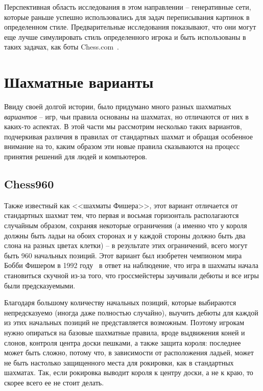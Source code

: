 \documentclass{article}
\begin{document}
Перспективная область исследования в этом направлении -- генеративные сети,
которые раньше успешно использовались для задач переписывания картинок в определенном стиле.
Предварительные исследования показывают, что они могут еще лучше симулировать стиль определенного игрока
и быть использованы в таких задачах, как боты Chess.com~\cite{chess-stylegan}.

\section{Шахматные варианты}

Ввиду своей долгой истории, было придумано много разных шахматных \emph{вариантов} --
игр, чьи правила основаны на шахматах, но отличаются от них в каких-то аспектах.
В этой части мы рассмотрим несколько таких вариантов, 
подчеркивая различия в правилах от стандартных шахмат
и обращая особенное внимание на то,
каким образом эти новые правила
сказываются на процесс принятия решений для людей и компьютеров.

\subsection{Chess960}

Также известный как <<шахматы Фишера>>, этот вариант
отличается от стандартных шахмат тем, что первая и восьмая горизонталь располагаются случайным образом,
сохраняя некоторые ограничения (а именно что у короля должны быть ладьи на обоих сторонах и у каждой стороны должно быть два слона на разных цветах клетки) --
в результате этих ограничений, всего могут быть 960 начальных позиций.
Этот вариант был изобретен чемпионом мира Бобби Фишером в 1992 году~\cite{chess960}
в ответ на наблюдение, что игра в шахматы начала становиться скучной
из-за того, что гроссмейстеры заучивали дебюты 
и все игры были предсказуемыми.

Благодаря большому количеству начальных позиций, 
которые выбираются непредсказуемо (иногда даже полностью случайно),
выучить дебюты для каждой из этих начальных позиций
не представляется возможным.
Поэтому игрокам нужно опираться на базовые шахматные правила,
вроде выдвижения коней и слонов, контроля центра доски пешками,
а также защита короля:
последнее может быть сложно, потому что, в зависимости от расположения ладьей,
может не быть настолько защищенного места для рокировки, как в стандартных шахматах.
Так, если рокировка выводит короля к центру доски, а не к краю, то скорее всего ее не стоит делать.
\end{document}
